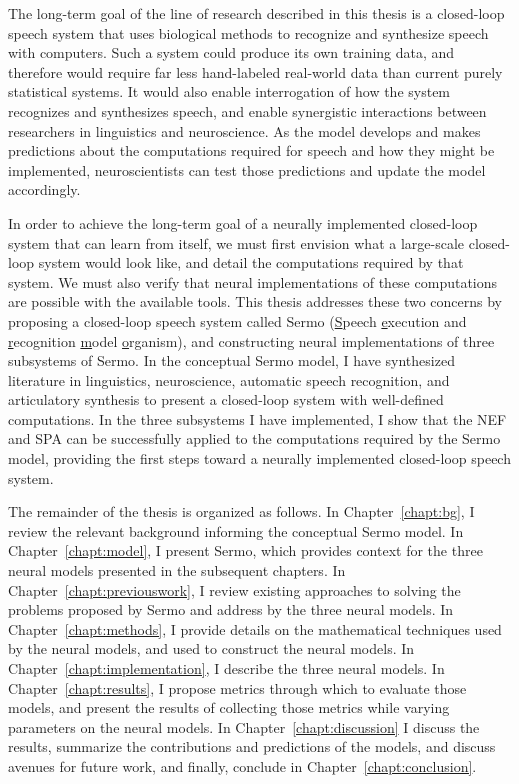 The long-term goal of the line of research
described in this thesis
is a closed-loop speech system
that uses biological methods
to recognize and synthesize speech
with computers.
Such a system could produce its own training data,
and therefore would require
far less hand-labeled real-world data than
current purely statistical systems.
It would also enable interrogation
of how the system recognizes
and synthesizes speech,
and enable synergistic interactions
between researchers in linguistics
and neuroscience.
As the model develops and makes predictions
about the computations required for speech
and how they might be implemented,
neuroscientists can test those predictions
and update the model accordingly.

In order to achieve the long-term goal
of a neurally implemented closed-loop system
that can learn from itself,
we must first
envision what a large-scale closed-loop system
would look like,
and detail the computations required by that system.
We must also verify that neural implementations
of these computations
are possible with the available tools.
This thesis addresses these two concerns
by proposing a closed-loop speech system
called Sermo
(\underline{S}peech \underline{e}xecution and
\underline{r}ecognition \underline{m}odel \underline{o}rganism),
and constructing neural implementations
of three subsystems of Sermo.
In the conceptual Sermo model,
I have synthesized literature
in linguistics, neuroscience,
automatic speech recognition,
and articulatory synthesis
to present a closed-loop system
with well-defined computations.
In the three subsystems I have implemented,
I show that the NEF and SPA
can be successfully applied to
the computations required by the Sermo model,
providing the first steps
toward a neurally implemented closed-loop speech system.

The remainder of the thesis is organized as follows.
In Chapter~\ref{chapt:bg},
I review the relevant background informing
the conceptual Sermo model.
In Chapter~\ref{chapt:model},
I present Sermo,
which provides context for
the three neural models presented
in the subsequent chapters.
In Chapter~\ref{chapt:previouswork},
I review existing approaches
to solving the problems
proposed by Sermo
and address by the three neural models.
In Chapter~\ref{chapt:methods},
I provide details on the
mathematical techniques
used by the neural models,
and used to construct the neural models.
In Chapter~\ref{chapt:implementation},
I describe the three neural models.
In Chapter~\ref{chapt:results},
I propose metrics through which
to evaluate those models,
and present the results of collecting those metrics
while varying parameters on the neural models.
In Chapter~\ref{chapt:discussion}
I discuss the results,
summarize the contributions and predictions
of the models,
and discuss avenues for future work,
and finally,
conclude in Chapter~\ref{chapt:conclusion}.
